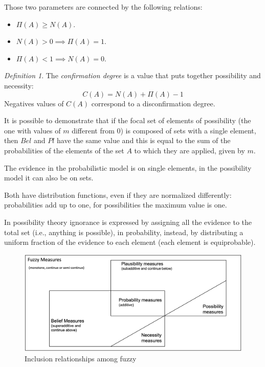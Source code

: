 \documentclass[12pt, a4paper]{report}
\theoremstyle{remark}
\newtheorem*{remark}{Definition}
\begin{document}
    Those two parameters are connected by the following relations: 
    \begin{itemize}
        \item $\Pi(A) \geq N(A)$.
        \item $N(A) > 0 \implies \Pi(A)=1$.
        \item $\Pi(A) < 1 \implies N(A)=0$.
    \end{itemize}
    \begin{remark}
        The \emph{confirmation degree} is a value that puts together possibility and necessity:
        \[C(A)=N(A)+\Pi(A)-1\]
        Negatives values of $C(A)$ correspond to a disconfirmation degree. 
    \end{remark}

    It is possible to demonstrate that if the focal set of elements of possibility (the one with values of $m$ different from $0$) is composed of sets with a single element,
    then $Bel$ and $Pl$ have the same value and this is equal to the sum of the probabilities of the elements of the set $A$ to which they are applied, given by $m$.

    The evidence in the probabilistic model is on single elements, in the possibility model it can also be on sets.

    Both have distribution functions, even if they are normalized differently: probabilities add up to one, for possibilities the maximum value is one.

    In possibility theory ignorance is expressed by assigning all the evidence to the total set (i.e., anything is possible), in probability, instead, by distributing a 
    uniform fraction of the evidence to each element (each element is equiprobable). 
    \begin{figure}[H]
        \centering
        \includegraphics[width=0.75\linewidth]{images/measures.png}
        \caption{Inclusion relationships among fuzzy}
    \end{figure}
\end{document}
